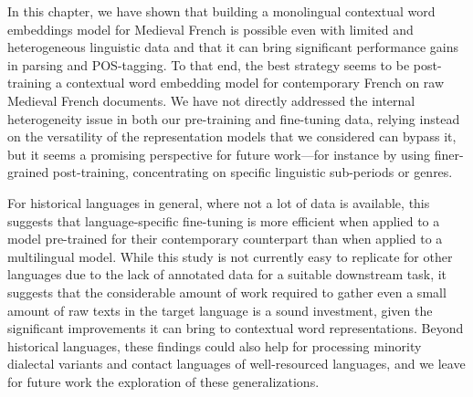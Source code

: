 In this chapter, we have shown that building a monolingual contextual word embeddings model for Medieval French is possible even with limited and heterogeneous linguistic data and that it can bring significant performance gains in parsing and POS-tagging. To that end, the best strategy seems to be post-training a contextual word embedding model for contemporary French on raw Medieval French documents. We have not directly addressed the internal heterogeneity issue in both our pre-training and fine-tuning data, relying instead on the versatility of the representation models that we considered can bypass it, but it seems a promising perspective for future work---for instance by using finer-grained post-training, concentrating on specific linguistic sub-periods or genres.

For historical languages in general, where not a lot of data is available, this suggests that language-specific fine-tuning is more efficient when applied to a model pre-trained for their contemporary counterpart than when applied to a multilingual model. While this study is not currently easy to replicate for other languages due to the lack of annotated data for a suitable downstream task, it suggests that the considerable amount of work required to gather even a small amount of raw texts in the target language is a sound investment, given the significant improvements it can bring to contextual word representations. Beyond historical languages, these findings could also help for processing minority dialectal variants and contact languages of well-resourced languages, and we leave for future work the exploration of these generalizations.
